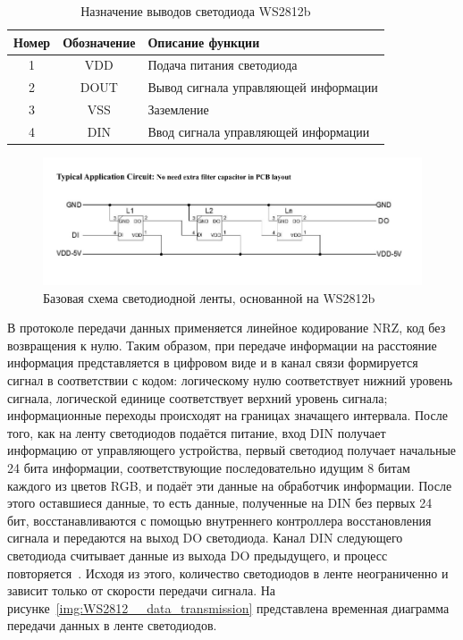 \begin{table}[H]
  \caption{Назначение выводов светодиода WS2812b}
  \label{tab:ws2812__pin}
  \begin{tabular}{|c|c|l|}
  \hline
  Номер & Обозначение & Описание функции \\ \hline
  1 & VDD  & Подача питания светодиода            \\ \hline
  2 & DOUT & Вывод сигнала управляющей информации \\ \hline
  3 & VSS  & Заземление                           \\ \hline
  4 & DIN  & Ввод сигнала управляющей информации  \\ \hline
  \end{tabular}
  \end{table}

\begin{figure}[H]
  \centering
  \includegraphics[height=0.2\textheight]{assets/images/theoretical/Базовая схема светодиодной ленты.png}
  \caption{Базовая схема светодиодной ленты, основанной на WS2812b}
  \label{img:WS2812__strip}
\end{figure}

В протоколе передачи данных применяется линейное кодирование NRZ, код без возвращения к нулю. Таким образом, при передаче информации на расстояние информация представляется в цифровом виде и в канал связи формируется сигнал в соответствии с кодом: логическому нулю соответствует нижний уровень сигнала, логической единице соответствует верхний уровень сигнала; информационные переходы происходят на границах значащего интервала. После того, как на ленту светодиодов подаётся питание, вход DIN получает информацию от управляющего устройства, первый светодиод получает начальные 24 бита информации, соответствующие последовательно идущим 8 битам каждого из цветов RGB, и подаёт эти данные на обработчик информации. После этого оставшиеся данные, то есть данные, полученные на DIN без первых 24 бит, восстанавливаются  с помощью внутреннего контроллера восстановления сигнала и передаются на выход DO светодиода. Канал DIN следующего светодиода считывает данные из выхода DO предыдущего, и процесс повторяется~\cite{Worldseim}. Исходя из этого, количество светодиодов в ленте неограниченно и зависит только от скорости передачи сигнала. На рисунке~\ref{img:WS2812__data_transmission} представлена временная диаграмма передачи данных в ленте светодиодов.


